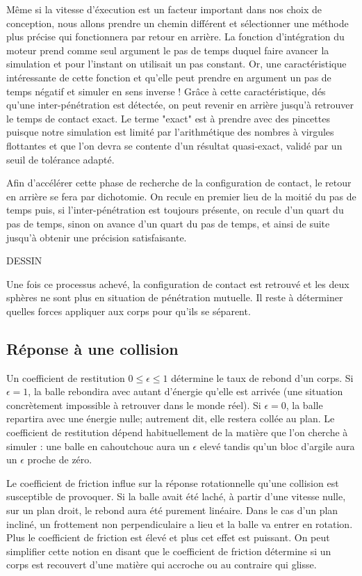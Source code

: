 Même si la vitesse d'éxecution est un facteur important dans nos choix de conception, nous allons prendre un chemin différent et sélectionner une méthode plus précise qui fonctionnera par retour en arrière. La fonction d'intégration du moteur prend comme seul argument le pas de temps duquel faire avancer la simulation et pour l'instant on utilisait un pas constant. Or, une caractéristique intéressante de cette fonction et qu'elle peut prendre en argument un pas de temps négatif et simuler en sens inverse ! Grâce à cette caractéristique, dés qu'une inter-pénétration est détectée, on peut revenir en arrière jusqu'à retrouver le temps de contact exact. Le terme "exact" est à prendre avec des pincettes puisque notre simulation est limité par l'arithmétique des nombres à virgules flottantes et que l'on devra se contente d'un résultat quasi-exact, validé par un seuil de tolérance adapté.

Afin d'accélérer cette phase de recherche de la configuration de contact, le retour en arrière se fera par dichotomie. On recule en premier lieu de la moitié du pas de temps puis, si l'inter-pénétration est toujours présente, on recule d'un quart du pas de temps, sinon on avance d'un quart du pas de temps, et ainsi de suite jusqu'à obtenir une précision satisfaisante.

DESSIN

Une fois ce processus achevé, la configuration de contact est retrouvé et les deux sphères ne sont plus en situation de pénétration mutuelle. Il reste à déterminer quelles forces appliquer aux corps pour qu'ils se séparent.

\subsection{Réponse à une collision}

Un coefficient de restitution $0 \leq \epsilon \leq 1$ détermine le taux de rebond d'un corps. Si $\epsilon = 1$, la balle rebondira avec autant d'énergie qu'elle est arrivée (une situation concrètement impossible à retrouver dans le monde réel). Si $\epsilon = 0$, la balle repartira avec une énergie nulle; autrement dit, elle restera collée au plan. Le coefficient de restitution dépend habituellement de la matière que l'on cherche à simuler : une balle en cahoutchouc aura un $\epsilon$ elevé tandis qu'un bloc d'argile aura un $\epsilon$ proche de zéro.

Le coefficient de friction influe sur la réponse rotationnelle qu'une collision est susceptible de provoquer. Si la balle avait été laché, à partir d'une vitesse nulle, sur un plan droit, le rebond aura été purement linéaire. Dans le cas d'un plan incliné, un frottement non perpendiculaire a lieu et la balle va entrer en rotation. Plus le coefficient de friction est élevé et plus cet effet est puissant. On peut simplifier cette notion en disant que le coefficient de friction détermine si un corps est recouvert d'une matière qui accroche ou au contraire qui glisse.

